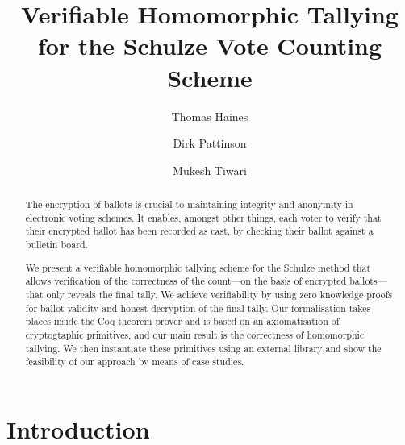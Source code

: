 \documentclass{llncs}
\begin{document}
\title{Verifiable Homomorphic Tallying for the Schulze Vote Counting
Scheme}

%
\author{Thomas Haines  \and
      Dirk Pattinson \and Mukesh Tiwari }
\maketitle

\begin{abstract}
The encryption of ballots is crucial to maintaining integrity and 
anonymity in electronic voting schemes. It enables, amongst other 
things, each voter to verify that their encrypted ballot has been 
recorded as cast, by checking their ballot against a bulletin board. 

We present a verifiable homomorphic tallying scheme for the Schulze 
method that allows verification of the correctness of the count---on the 
basis of encrypted ballots---that only reveals the final tally. We 
achieve verifiability by using zero knowledge proofs for ballot 
validity and honest decryption of the final tally. Our formalisation 
takes places inside the Coq theorem prover and is based on an 
axiomatisation of cryptogtaphic primitives, and our main result is 
the correctness of homomorphic tallying. We then instantiate 
these primitives using an external library and show the feasibility 
of our approach by means of case studies.
\end{abstract}


\section{Introduction}
\end{document}
